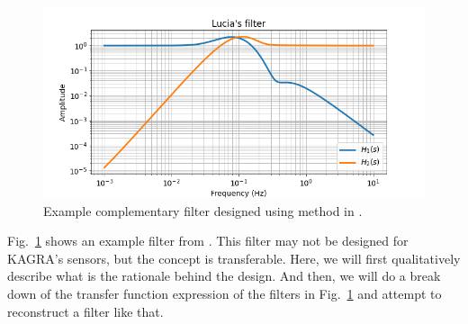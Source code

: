 \begin{figure}[!h]
	\centering
	\includegraphics[width=0.7\linewidth]{figures/lucia_complementary_filter}
	\caption{Example complementary filter designed using method in \cite{low_frequency_optimization_and_performance_of_advanced_virgo_seismic_isolation_system}.}
	\label{fig:luciacomplementaryfilter}
\end{figure}
Fig.~\ref{fig:luciacomplementaryfilter} shows an example filter from \cite{low_frequency_optimization_and_performance_of_advanced_virgo_seismic_isolation_system}.
This filter may not be designed for KAGRA's sensors, but the concept is transferable.
Here, we will first qualitatively describe what is the rationale behind the design.
And then, we will do a break down of the transfer function expression of the filters in Fig.~\ref{fig:luciacomplementaryfilter} and attempt to reconstruct a filter like that.

